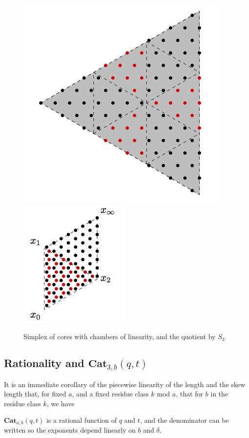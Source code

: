\documentclass{amsart}[12pt]
\theoremstyle{definition}
\newcommand{\Cat}{\mathbf{Cat}}
\begin{document}
\begin{figure}
\caption{Simplex of cores with chambers of linearity, and the quotient by $S_3$}
\includegraphics{chamberspic.png}
\includegraphics{quotientpic.png}
\end{figure}



\subsection{Rationality and $\Cat_{3,b}(q,t)$}

It is an immediate corollary of the piecewise linearity of the length and the skew length that, for fixed $a$, and a fixed residue class $k$ mod $a$, that for $b$ in the residue class $k$, we have

$\Cat_{a,b}(q,t)$ is a rational function of $q$ and $t$, and the denominator can be written so the exponents depend linearly on $b$ and $\delta$.
\end{document}
